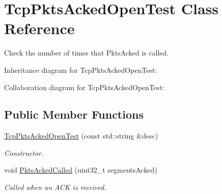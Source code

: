 \hypertarget{classTcpPktsAckedOpenTest}{}\section{Tcp\+Pkts\+Acked\+Open\+Test Class Reference}
\label{classTcpPktsAckedOpenTest}


Check the number of times that Pkts\+Acked is called.  




Inheritance diagram for Tcp\+Pkts\+Acked\+Open\+Test\+:


Collaboration diagram for Tcp\+Pkts\+Acked\+Open\+Test\+:
\subsection*{Public Member Functions}
\begin{DoxyCompactItemize}
\item 
\hyperlink{classTcpPktsAckedOpenTest_aef0b6f182c1c1259b4ef91715ea3e3e7}{Tcp\+Pkts\+Acked\+Open\+Test} (const std\+::string \&desc)
\begin{DoxyCompactList}\small\item\em Constructor. \end{DoxyCompactList}\item 
void \hyperlink{classTcpPktsAckedOpenTest_a171ef7aafcb972dd1525800ffce0f455}{Pkts\+Acked\+Called} (uint32\+\_\+t segments\+Acked)
\begin{DoxyCompactList}\small\item\em Called when an A\+CK is received. \end{DoxyCompactList}\end{DoxyCompactItemize}
